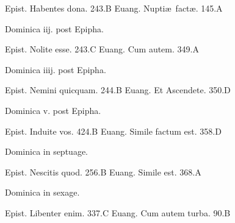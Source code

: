 \documentclass[a5paper,10pt]{book}
\def\ae{æ}
\begin{document}
\begin{multicols}{2}
\par \noindent Epist. Habentes dona. \hfill 243.B
\newline Euang. Nupti\ae \ fact\ae . \hfill 145.A
\newline \vspace{-1.75em}
\begin{center}
\color{red} Dominica iij. post Epipha.
\end{center}
\vspace{-.75em}
\par \noindent Epist. Nolite esse. \hfill 243.C
\newline Euang. Cum autem. \hfill 349.A
\newline \vspace{-1.75em}
\begin{center}
\color{red} Dominica iiij. post Epipha.
\end{center}
\vspace{-.75em}
\par \noindent Epist. Nemini quicquam. \hfill 244.B%
\newline Euang. Et Ascendete. \hfill 350.D
\newline \vspace{-1.75em}
\begin{center}
\color{red} Dominica v. post Epipha.
\end{center}
\vspace{-.75em}
\par \noindent Epist. Induite vos. \hfill 424.B
\newline Euang. Simile factum est. \hfill 358.D
\newline \vspace{-1.75em}
\begin{center}
\color{red} Dominica in septuage.
\end{center}
\vspace{-.75em}
\par \noindent Epist. Nescitis quod. \hfill 256.B
\newline Euang. Simile est. \hfill 368.A
\newline \vspace{-1.75em}
\begin{center}
\color{red} Dominica in sexage.
\end{center}
\vspace{-.75em}
\par \noindent Epist. Libenter enim. \hfill 337.C
\newline Euang. Cum autem turba. \hfill 90.B
\newline \vspace{-1.75em}

\end{multicols}
\end{document}
